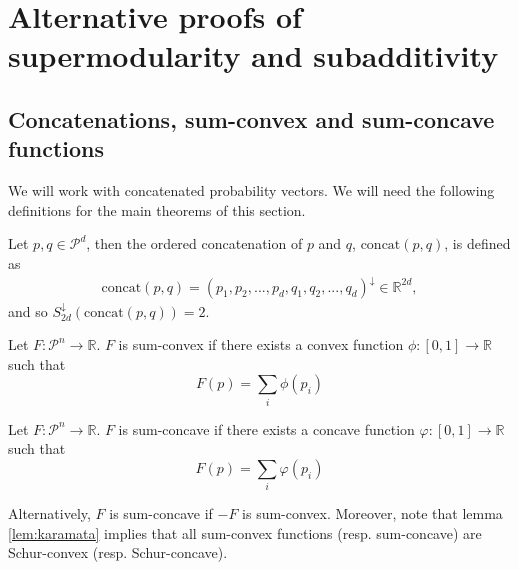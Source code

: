 \chapter{Alternative proofs of supermodularity and subadditivity} \label{chap:alternative}

\section{Concatenations, sum-convex and sum-concave functions}

We will work with concatenated probability vectors. We will need the following definitions for the main theorems of this section.

\begin{definition} \label{def:concatenation}
    Let $p, q \in \mathcal{P}^d$, then the ordered concatenation of $p$ and $q$, $\text{concat}(p, q)$, is defined as
    \begin{align}
        \text{concat}(p, q) = (p_1, p_2, ..., p_d, q_1, q_2, ..., q_d)^\downarrow \in \mathbb{R}^{2d},
    \end{align}
    and so $S^\downarrow_{2d}(\text{concat}(p, q)) = 2$.
\end{definition}

\begin{definition} \label{def:sum-convex} %
    Let $F: \mathcal{P}^n \rightarrow \mathbb{R}$. $F$ is sum-convex if there exists a convex function $\phi: [0, 1] \rightarrow \mathbb{R}$ such that
    \begin{equation} \label{eq:sum-convex}
        F(p) = \sum_i \phi(p_i)
    \end{equation}
\end{definition}

\begin{definition} \label{def:sum-concave} %
    Let $F: \mathcal{P}^n \rightarrow \mathbb{R}$. $F$ is sum-concave if there exists a concave function $\varphi: [0, 1] \rightarrow \mathbb{R}$ such that
    \begin{equation} \label{eq:sum-concave}
        F(p) = \sum_i \varphi(p_i)
    \end{equation}
\end{definition}

\noindent Alternatively, $F$ is sum-concave if $-F$ is sum-convex. Moreover, note that lemma \ref{lem:karamata} implies that all sum-convex functions (resp. sum-concave) are Schur-convex (resp. Schur-concave).



